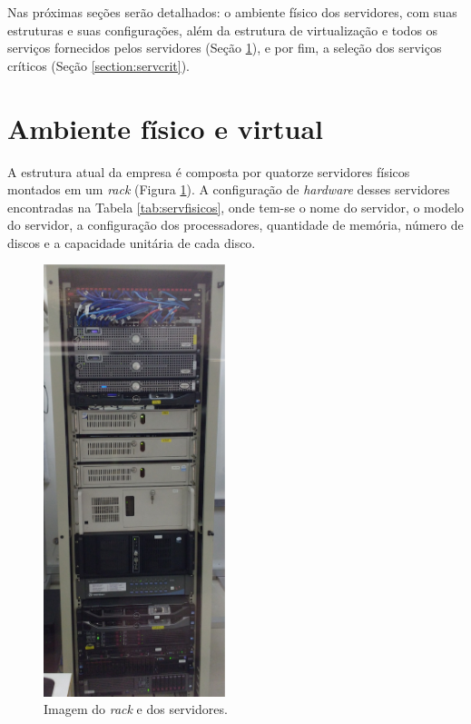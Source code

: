 Nas próximas seções serão detalhados: o ambiente físico dos servidores, com suas estruturas e suas configurações, além da estrutura de 
virtualização e todos os serviços fornecidos pelos servidores (Seção \ref{section:ambiente}), e por fim, a seleção dos serviços 
críticos (Seção \ref{section:servcrit}).

\section{Ambiente físico e virtual}
\label{section:ambiente}

A estrutura atual da empresa é composta por quatorze servidores físicos montados em um \textit{rack} (Figura \ref{fig:servrack}). 
A configuração de \textit{hardware} desses servidores encontradas na Tabela \ref{tab:servfisicos}, onde tem-se o nome do servidor, o modelo do 
servidor, a configuração dos processadores, quantidade de memória, número de discos e a capacidade unitária de cada disco.

\begin{figure}[h!]
 \centering
 \includegraphics[width=200px]{img/servrack.eps}
 \caption{Imagem do \textit{rack} e dos servidores.}
 \label{fig:servrack}
\end{figure}


